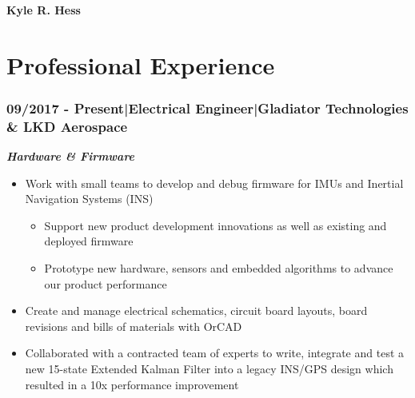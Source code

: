 \documentclass[]{article}
\begin{document}
\begin{singlespace}
\noindent\textbf{\huge{Kyle R. Hess}}
\hfill \break
\noindent\makebox[\linewidth]{\rule{\textwidth}{1pt}}


\section*{Professional Experience}

\subsubsection*{09/2017 - Present\hspace{3 mm}|\hspace{3 mm}Electrical Engineer\hspace{3 mm}|\hspace{3 mm}Gladiator Technologies \& LKD Aerospace}
\textbf{\emph{Hardware \& Firmware}}
\vspace{-2mm}
\begin{itemize}
    \setlength\itemsep{0em}
    \item Work with small teams to develop and debug firmware for IMUs and Inertial Navigation Systems (INS)
    \vspace{-2mm}
    \begin{itemize}
        \setlength\itemsep{0em}
        \item Support new product development innovations as well as existing and deployed firmware
        \item Prototype new hardware, sensors and embedded algorithms to advance our product performance
    \end{itemize}
    \vspace{-1mm}
    \item Create and manage electrical schematics, circuit board layouts, board revisions and bills of materials with OrCAD
    \item Collaborated with a contracted team of experts to write, integrate and test a new 15-state Extended Kalman Filter into a legacy INS/GPS design which resulted in a 10x performance improvement
\end{itemize}


\end{singlespace}
\end{document}
